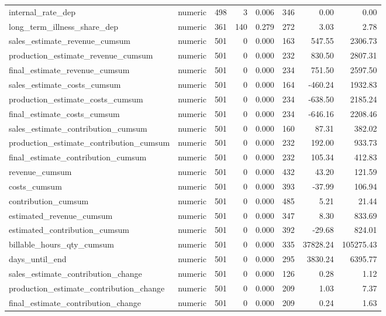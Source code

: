 \begin{landscape}
\begin{longtable}[t]{llrrrrrr}
internal\_rate\_dep & numeric & 498 & 3 & 0.006 & 346 & 0.00 & 0.00\\
long\_term\_illness\_share\_dep & numeric & 361 & 140 & 0.279 & 272 & 3.03 & 2.78\\
sales\_estimate\_revenue\_cumsum & numeric & 501 & 0 & 0.000 & 163 & 547.55 & 2306.73\\
production\_estimate\_revenue\_cumsum & numeric & 501 & 0 & 0.000 & 232 & 830.50 & 2807.31\\
final\_estimate\_revenue\_cumsum & numeric & 501 & 0 & 0.000 & 234 & 751.50 & 2597.50\\
sales\_estimate\_costs\_cumsum & numeric & 501 & 0 & 0.000 & 164 & -460.24 & 1932.83\\
production\_estimate\_costs\_cumsum & numeric & 501 & 0 & 0.000 & 234 & -638.50 & 2185.24\\
final\_estimate\_costs\_cumsum & numeric & 501 & 0 & 0.000 & 234 & -646.16 & 2208.46\\
sales\_estimate\_contribution\_cumsum & numeric & 501 & 0 & 0.000 & 160 & 87.31 & 382.02\\
production\_estimate\_contribution\_cumsum & numeric & 501 & 0 & 0.000 & 232 & 192.00 & 933.73\\
final\_estimate\_contribution\_cumsum & numeric & 501 & 0 & 0.000 & 232 & 105.34 & 412.83\\
revenue\_cumsum & numeric & 501 & 0 & 0.000 & 432 & 43.20 & 121.59\\
costs\_cumsum & numeric & 501 & 0 & 0.000 & 393 & -37.99 & 106.94\\
contribution\_cumsum & numeric & 501 & 0 & 0.000 & 485 & 5.21 & 21.44\\
estimated\_revenue\_cumsum & numeric & 501 & 0 & 0.000 & 347 & 8.30 & 833.69\\
estimated\_contribution\_cumsum & numeric & 501 & 0 & 0.000 & 392 & -29.68 & 824.01\\
billable\_hours\_qty\_cumsum & numeric & 501 & 0 & 0.000 & 335 & 37828.24 & 105275.43\\
days\_until\_end & numeric & 501 & 0 & 0.000 & 295 & 3830.24 & 6395.77\\
sales\_estimate\_contribution\_change & numeric & 501 & 0 & 0.000 & 126 & 0.28 & 1.12\\
production\_estimate\_contribution\_change & numeric & 501 & 0 & 0.000 & 209 & 1.03 & 7.37\\
final\_estimate\_contribution\_change & numeric & 501 & 0 & 0.000 & 209 & 0.24 & 1.63\\

\end{longtable}
\end{landscape}
